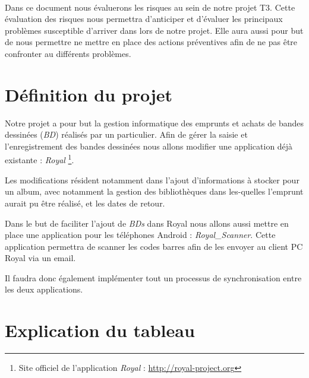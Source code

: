 \documentclass[etudiants]{support-iutrs}
\begin{document}
\header

\paragraph{}
Dans ce document nous évaluerons les risques au sein de notre projet T3. 
Cette évaluation des risques nous permettra d'anticiper et d'évaluer les principaux problèmes susceptible d'arriver dans lors de notre projet.
Elle aura aussi pour but de nous permettre ne mettre en place des actions préventives afin de ne pas être confronter au différents problèmes.  

\section*{Définition du projet}

Notre projet a pour but la gestion informatique des emprunts et achats de bandes dessinées (\emph{BD}) réalisés par un particulier.
Afin de gérer la saisie et l'enregistrement des bandes dessinées nous allons modifier une application déjà existante : \emph{Royal}
\footnote{Site officiel de l'application \emph{Royal} : \url{http://royal-project.org}}.

Les modifications résident notamment dans l'ajout d'informations à stocker pour un album, avec notamment la gestion des bibliothèques dans les-quelles l'emprunt aurait pu être réalisé, et les dates de retour. 

Dans le but de faciliter l'ajout de \emph{BDs} dans Royal nous allons aussi mettre en place une application pour les téléphones Android : \emph{Royal\_Scanner}.
Cette application permettra de scanner les codes barres afin de les envoyer au client PC Royal via un email.

Il faudra donc également implémenter tout un processus de synchronisation entre les deux applications. 

\section*{Explication du tableau}
\end{document}
